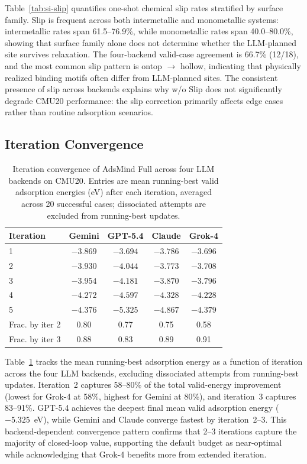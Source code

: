 \documentclass[%
 preprint,
 superscriptaddress,
 amsmath,amssymb,
 aps,
 prb,
 floatfix,
]{revtex4-2}
\begin{document}
Table~\ref{tab:si-slip} quantifies one-shot chemical slip rates stratified by surface family. Slip is frequent across both intermetallic and monometallic systems: intermetallic rates span 61.5--76.9\%, while monometallic rates span 40.0--80.0\%, showing that surface family alone does not determine whether the LLM-planned site survives relaxation. The four-backend valid-case agreement is 66.7\% (12/18), and the most common slip pattern is ontop $\rightarrow$ hollow, indicating that physically realized binding motifs often differ from LLM-planned sites. The consistent presence of slip across backends explains why w/o Slip does not significantly degrade CMU20 performance: the slip correction primarily affects edge cases rather than routine adsorption scenarios.

\subsection{Iteration Convergence}

\begin{table}[ht]
\centering
\caption{Iteration convergence of AdsMind Full across four LLM backends on CMU20. Entries are mean running-best valid adsorption energies (eV) after each iteration, averaged across 20 successful cases; dissociated attempts are excluded from running-best updates.}
\label{tab:si-convergence}
\begin{tabular}{lcccc}
\toprule
Iteration & Gemini & GPT-5.4 & Claude & Grok-4 \\
\midrule
1 & $-3.869$ & $-3.694$ & $-3.786$ & $-3.696$ \\
2 & $-3.930$ & $-4.044$ & $-3.773$ & $-3.708$ \\
3 & $-3.954$ & $-4.181$ & $-3.870$ & $-3.796$ \\
4 & $-4.272$ & $-4.597$ & $-4.328$ & $-4.228$ \\
5 & $-4.376$ & $-5.325$ & $-4.867$ & $-4.379$ \\
\midrule
Frac. by iter 2 & 0.80 & 0.77 & 0.75 & 0.58 \\
Frac. by iter 3 & 0.88 & 0.83 & 0.89 & 0.91 \\
\bottomrule
\end{tabular}
\end{table}

Table~\ref{tab:si-convergence} tracks the mean running-best adsorption energy as a function of iteration across the four LLM backends, excluding dissociated attempts from running-best updates. Iteration~2 captures 58--80\% of the total valid-energy improvement (lowest for Grok-4 at 58\%, highest for Gemini at 80\%), and iteration~3 captures 83--91\%. GPT-5.4 achieves the deepest final mean valid adsorption energy ($-5.325$~eV), while Gemini and Claude converge fastest by iteration~2--3. This backend-dependent convergence pattern confirms that 2--3 iterations capture the majority of closed-loop value, supporting the default budget as near-optimal while acknowledging that Grok-4 benefits more from extended iteration.
\end{document}
